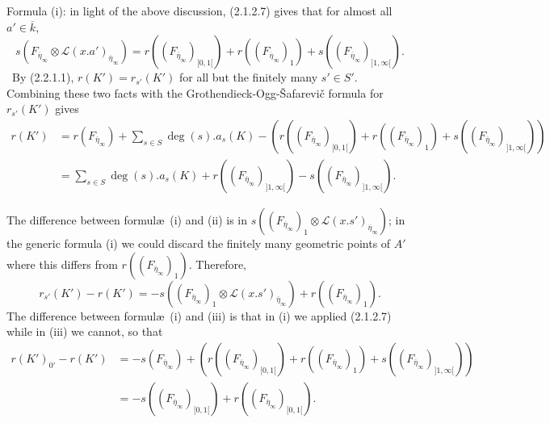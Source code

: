 \documentclass[deligne.tex]{subfiles}
\begin{document}
Formula (i): in light of the above discussion, (2.1.2.7) gives that for
almost all $a'\in\overline k$,
\begin{equation*}
s(F_{\overline\eta_\infty}\otimes\mathscr L(x.a')_{\overline\eta_\infty})
=r((F_{\overline\eta_\infty})_{[0,1[})+r((F_{\overline\eta_\infty})_1)+ s((F_{\overline\eta_\infty})_{]1,\infty[}).
\end{equation*}\
By (2.2.1.1), $r(K')=r_{s'}(K')$ for all but the finitely many $s'\in S'$.
Combining these two facts with the Grothendieck-Ogg-\v Safarevi\v c formula for $r_{s'}(K')$ gives
\begin{align*}
	r(K')&=r(F_{\overline\eta_\infty})+\sum_{s\in S}\deg(s).a_s(K)-(r((F_{\overline\eta_\infty})_{[0,1[})+r((F_{\overline\eta_\infty})_1)+ s((F_{\overline\eta_\infty})_{]1,\infty[})) \\
	&=\sum_{s\in S}\deg(s).a_s(K)+r((F_{\overline\eta_\infty})_{]1,\infty[})-s((F_{\overline\eta_\infty})_{]1,\infty[}).
\end{align*}

The difference between formul\ae\ (i) and (ii) is in
$s((F_{\overline\eta_\infty})_1\otimes\mathscr L(x.s')_{\overline\eta_\infty})$;
in the generic formula (i) we could discard the finitely many geometric
points of $A'$ where this differs from $r((F_{\overline\eta_\infty})_1)$.
Therefore,
\begin{equation*}
	r_{s'}(K')-r(K')=-s((F_{\overline\eta_\infty})_1\otimes\mathscr L(x.s')_{\overline\eta_\infty})+r((F_{\overline\eta_\infty})_1).
\end{equation*}
The difference between formul\ae\ (i) and (iii) is that in (i) we applied
(2.1.2.7) while in (iii) we cannot, so that
\begin{align*}
	r(K')_{0'}-r(K')
	&=-s(F_{\overline\eta_\infty})
	+(r((F_{\overline\eta_\infty})_{[0,1[})+r((F_{\overline\eta_\infty})_1)+ s((F_{\overline\eta_\infty})_{]1,\infty[})) \\
	&=-s((F_{\overline\eta_\infty})_{[0,1[})+ r((F_{\overline\eta_\infty})_{[0,1[}).
\end{align*}
\end{document}
